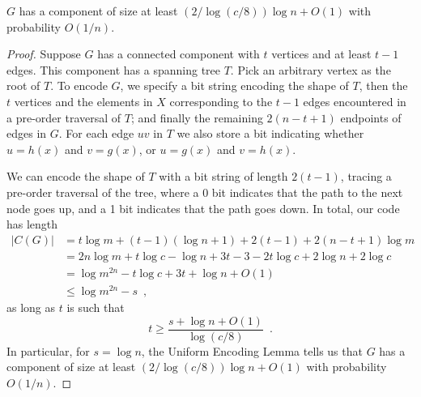 \documentclass{patmorin}
\newcommand{\aremark}[3]{\textcolor{blue}{\textsc{#1 #2:}}
  \textcolor{red}{\textsf{#3}}}
\newcommand{\wolfgang}[2][says]{\aremark{Wolfgang}{#1}{#2}}
\begin{document}
\begin{lem}
  $G$ has a component of size at least $(2/\log(c/8))\log n + O(1)$
  with probability $O(1/n)$.
\end{lem}
\begin{proof}
  Suppose $G$ has a connected component with $t$ vertices and at least
  $t-1$ edges. This component has a spanning tree $T$. Pick an
  arbitrary vertex as the root of $T$. To encode $G$, we specify
  a bit string encoding the shape of $T$, then
  the $t$ vertices and the elements in $X$ corresponding to
  the $t-1$ edges encountered in a pre-order
  traversal of $T$; and
  finally the remaining $2(n - t + 1)$ endpoints of edges in $G$.
  For each edge $uv$ in $T$ we also store a bit
   indicating whether $u = h(x)$ and $v = g(x)$, or $u
  = g(x)$ and $v = h(x)$.

  We can encode the shape of $T$ with a bit string of length
  $2(t - 1)$, tracing a pre-order traversal of the tree, where a 0 bit
  indicates that the path to the next node goes up, and a 1 bit indicates
  that the path goes down. In total, our code has length
  \begin{align*}
    |C(G)| &= t \log m + (t - 1) (\log n + 1) + 2(t - 1) + 2 (n - t + 1) \log m \\
           &= 2n\log m + t \log c - \log n + 3t - 3 - 2t \log c + 2\log n + 2 \log c \tag{since $m = cn$}\\
           &= \log m^{2n} - t \log c + 3t + \log n + O(1) \\
           &\le \log m^{2n} - s \enspace ,
  \end{align*}
  as long as $t$ is such that
  \[
    t \geq \frac{s + \log n + O(1)}{\log (c/8)} \enspace .
  \]
  In particular, for $s = \log n$, the Uniform
  Encoding Lemma tells us that $G$ has a component of size at least
  $(2/\log (c/8))\log n + O(1)$ with probability $O(1/n)$.
\end{proof}
\end{document}
